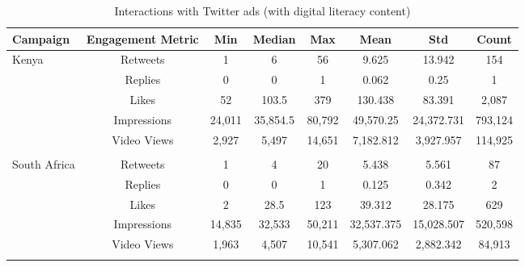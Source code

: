 \begin{table}[h!]
\centering
\caption{Interactions with Twitter ads (with digital literacy content)}
\label{tab:ads_dl}
\begin{tabular}{lccccccc}
  \hline
 \bfseries{Campaign} & \bfseries{Engagement Metric} & \bfseries{Min} & \bfseries{Median} & \bfseries{Max} & \bfseries{Mean} & \bfseries{Std} & \bfseries{Count} \\ 
  \hline
  Kenya & Retweets & 1 & 6 & 56 & 9.625 & 13.942 & 154 \\ 
 & Replies & 0 & 0 & 1 & 0.062 & 0.25 & 1\\ 
 & Likes &  52 & 103.5 & 379 & 130.438 & 83.391 & 2,087\\ 
 & Impressions &  24,011 & 35,854.5 & 80,792 & 49,570.25 & 24,372.731 & 793,124\\
 & Video Views & 2,927 & 5,497 & 14,651 & 7,182.812 & 3,927.957 & 114,925
 \\\hline \\[-1.8ex] 
 South Africa & Retweets & 1 & 4 & 20 & 5.438 & 5.561 & 87 \\ 
 & Replies & 0 & 0 & 1 & 0.125 & 0.342 & 2\\ 
 & Likes &  2 & 28.5 & 123 & 39.312 & 28.175 & 629\\ 
 & Impressions & 14,835 & 32,533 & 50,211 & 32,537.375 & 15,028.507 & 520,598\\
 & Video Views & 1,963 & 4,507 & 10,541 & 5,307.062 & 2,882.342 & 84,913\\
   \hline\\

\end{tabular}
\end{table}



